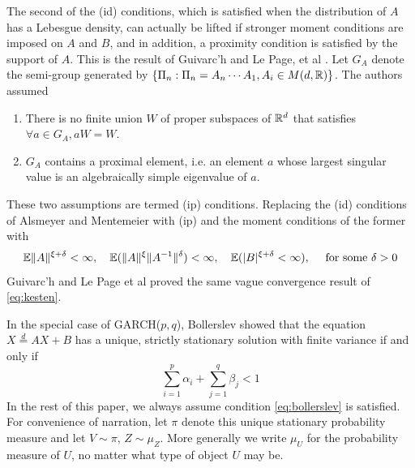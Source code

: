 \documentclass[aoas,preprint]{imsart}
\numberwithin{equation}{section}
\theoremstyle{plain}
\begin{document}
The second of the (id) conditions, which is satisfied when the
distribution of $A$ has a Lebesgue density, can actually be lifted if
stronger moment conditions are imposed on $A$ and $B$, and in
addition, a proximity condition is satisfied by the support of
$A$. This is the result of Guivarc'h and Le Page, et al
\cite{guivarc:page:2016}. Let $G_A$ denote the semi-group generated
by $\{\Pi_n: \Pi_n = A_n \cdots A_1, A_i \in M(d, \mathbb R)\}$. The
authors assumed
\begin{enumerate}
  \item There is no finite union $W$ of proper subspaces of $\mathbb R^d$
    that satisfies $\forall a \in G_A, a W = W$.
  \item $G_A$ contains a proximal element, i.e. an element $a$ whose
    largest singular value is an algebraically simple eigenvalue of $a$.
\end{enumerate}
These two assumptions are termed (ip) conditions. Replacing the (id)
conditions of Alsmeyer and Mentemeier with (ip) and the moment
conditions of the former with
\[
\mathbb{E} \|A\|^{\xi + \delta} < \infty, \quad
\mathbb{E} (\|A\|^{\xi} \|A^{-1}\|^{\delta}) < \infty, \quad
\mathbb{E} (|B|^{\xi + \delta} < \infty),\quad
\text{ for some }\delta > 0
\]
Guivarc'h and Le Page et al proved the same vague convergence result
of \eqref{eq:kesten}.

In the special case of GARCH($p, q$),
Bollerslev \cite{bollerslev:1986} showed that the 
equation $X \overset{d}{=} A X + B$ has a unique, strictly
stationary solution with finite variance if and only if
\begin{equation}
  \sum_{i=1}^p \alpha_i + \sum_{j=1}^q \beta_j < 1
  \label{eq:bollerslev}
\end{equation}
In the rest of this paper, we always assume condition
\eqref{eq:bollerslev} is satisfied. For convenience of narration, let
$\pi$ denote this unique stationary probability measure and let
$V \sim \pi$, $Z \sim \mu_Z$. More generally we write $\mu_U$ for the
probability measure of $U$, no matter what type of object $U$ may be.
\end{document}

